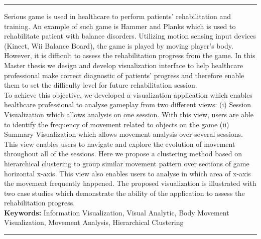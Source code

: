 \documentclass[a4paper,11pt,twoside]{ThesisStyle}
\begin{document}
\let\cleardoublepage\clearpage 



\begin{vcenterpage}
\noindent\rule[2pt]{\textwidth}{0.5pt}

Serious game is used in healthcare to perform patients' rehabilitation and training. An example of such game is Hammer and Planks which is used to rehabilitate patient with balance disorders. Utilizing motion sensing input devices (Kinect, Wii Balance Board), the game is played by moving player's body. However, it is difficult to assess the rehabilitation progress from the game. In this Master thesis we design and develop visualization interface to help healthcare professional make correct diagnostic of patients' progress and therefore enable them to set the difficulty level for future rehabilitation session.
\\
To achieve this objective, we developed a visualization application which enables healthcare professional to analyse gameplay from two different views: (i) Session Visualization which allows analysis on one session. With this view, users are able to identify the frequency of movement related to objects on the game (ii) Summary Visualization which allows movement analysis over several sessions. This view enables users to navigate and explore the evolution of movement throughout all of the sessions. Here we propose a clustering method based on hierarchical clustering to group similar movement pattern over sections of game horizontal x-axis. This view also enables users to analyse in which area of x-axis the movement frequently happened. The proposed visualization is illustrated with two case studies which demonstrate the ability of the application to assess the rehabilitation progress.
\\
{\large\textbf{Keywords:}}
Information Visualization, Visual Analytic, Body Movement Visualization, Movement Analysis, Hierarchical Clustering
\\
\noindent\rule[2pt]{\textwidth}{0.5pt}
\end{vcenterpage}
\end{document}
